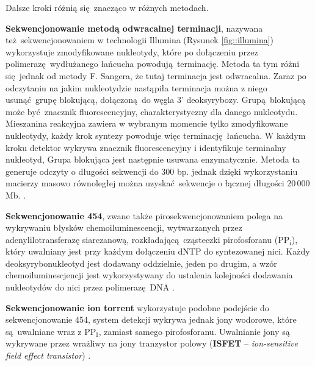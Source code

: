 \documentclass[two column, twoside, a4paper]{article}
\begin{document}
Dalsze kroki różnią się znacząco w różnych metodach.

\textbf{Sekwencjonowanie metodą odwracalnej terminacji}, nazywana też sekwencjonowaniem w technologii Illumina (Rysunek \ref{fig::illumina}) wykorzystuje zmodyfikowane nukleotydy, które po dołączeniu przez polimerazę wydłużanego łańcucha powodują terminację. Metoda ta tym różni się jednak od metody F. Sangera, że tutaj terminacja jest odwracalna. Zaraz po odczytaniu na jakim nukleotydzie nastąpiła terminacja można z niego usunąć grupę blokującą, dołączoną do węgla 3' deoksyrybozy. Grupą blokującą może być znacznik fluorescencyjny, charakterystyczny dla danego nukleotydu. Mieszanina reakcyjna zawiera w wybranym momencie tylko zmodyfikowane nukleotydy, każdy krok syntezy powoduje więc terminację łańcucha. W każdym kroku detektor wykrywa znacznik fluorescencyjny i identyfikuje terminalny nukleotyd, Grupa blokująca jest następnie usuwana enzymatycznie. Metoda ta generuje odczyty o długości sekwencji do 300 bp. jednak dzięki wykorzystaniu macierzy masowo równoległej można uzyskać sekwencje o łącznej długości $20\,000$ Mb. \autocite{Godwin2016}.

\textbf{Sekwencjonowanie 454}, zwane także pirosekwencjonowaniem polega na wykrywaniu błysków chemoiluminescencji, wytwarzanych przez adenylilotransferazę siarczanową, rozkładającą cząsteczki pirofosforanu ($\mathrm{PP_{i}}$), który uwalniany jest przy każdym dołączeniu dNTP do syntezowanej nici. Każdy deoksyrybonukleotyd jest dodawany oddzielnie, jeden po drugim, a wzór chemoiluminescjencji jest wykorzystywany do ustalenia kolejności dodawania nukleotydów do nici przez polimerazę DNA \autocite{Brown2019} \autocite{Godwin2016}.

\textbf{Sekwencjonowanie ion torrent} wykorzystuje podobne podejście do sekwencjonowanie 454, system detekcji wykrywa jednak jony wodorowe, które są uwalniane wraz z $\mathrm{PP_{I}}$, zamiast samego pirofosforanu. Uwalnianie jony są wykrywane przez wrażliwy na jony tranzystor polowy (\textbf{ISFET} -- \textit{ion-sensitive field effect transistor}) \autocite{Brown2019}.
\end{document}
